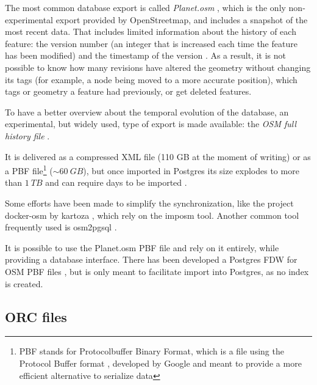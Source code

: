 \documentclass{Configuration_Files/PoliMi3i_thesis}
\begin{document}
The most common database export is called \textit{Planet.osm} \cite{PlanetOsmOpenStreetMap}, which is the only non-experimental export provided by OpenStreetmap, and includes a snapshot of the most recent data. That includes limited information about the history of each feature: the version number (an integer that is increased each time the feature has been modified) and the timestamp of the version \cite{OSMXMLOpenStreetMap}. As a result, it is not possible to know how many revisions have altered the geometry without changing its tags (for example, a node being moved to a more accurate position), which tags or geometry a feature had previously, or get deleted features.

To have a better overview about the temporal evolution of the database, an experimental, but widely used, type of export is made available: the \textit{OSM full history file} \cite{PlanetOsmFull}.

It is delivered as a compressed XML file (110 GB at the moment of writing) or as a PBF file\footnote{PBF stands for Protocolbuffer Binary Format, which is a file using the Protocol Buffer format \cite{ReleasesProtocolbuffersProtobuf}, developed by Google and meant to provide a more efficient alternative to serialize data} ($ \sim\SI{60}{GB} $), but once imported in Postgres its size explodes to more than $ \SI{1}{TB} $ and can require days to be imported \cite{Osm2pgsqlBenchmarksOpenStreetMap}.

Some efforts have been made to simplify the synchronization, like the project docker-osm by kartoza \cite{DockerOSM2022}, which rely on the imposm \cite{Imposm2022} tool. Another common tool frequently used is osm2pgsql \cite{Osm2pgsql2022}.

It is possible to use the Planet.osm PBF file and rely on it entirely, while providing a database interface. There has been developed a Postgres FDW for OSM PBF files \cite{pikulikOSMPBFForeign2022}, but is only meant to facilitate import into Postgres, as no index is created.

\subsection{ORC files}
\end{document}
